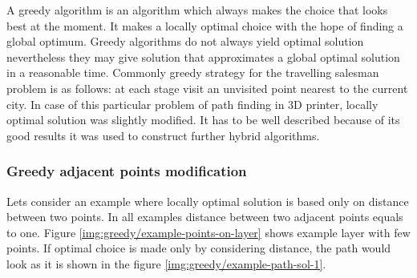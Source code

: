 \documentclass[titlepage]{article}
\begin{document}
A greedy algorithm is an algorithm which always makes the choice that looks best at the moment. It makes a locally optimal choice with the hope of finding a global optimum. Greedy algorithms do not always yield optimal solution nevertheless they may give solution that approximates a global optimal solution in a reasonable time. Commonly greedy strategy for the travelling salesman problem is as follows: at each stage visit an unvisited point nearest to the current city. In case of this particular problem of path finding in 3D printer, locally optimal solution was slightly modified. It has to be well described because of its good results it was used to construct further hybrid algorithms.

\subsubsection{Greedy adjacent points modification}

Lets consider an example where locally optimal solution is based only on distance between two points. In all examples distance between two adjacent points equals to one. Figure \ref{img:greedy/example-points-on-layer} shows example layer with few points. If optimal choice is made only by considering distance, the path would look as it is shown in the figure \ref{img:greedy/example-path-sol-1}.
\end{document}
